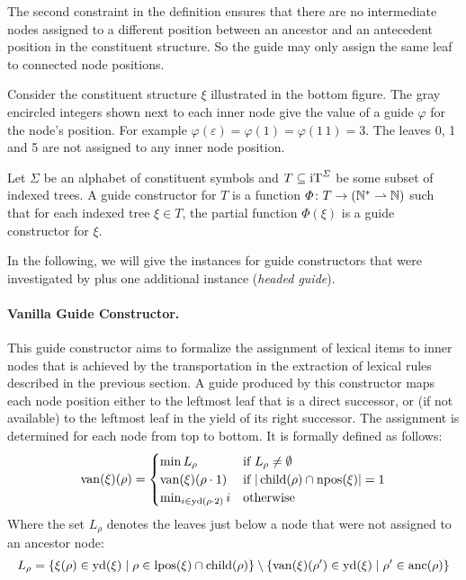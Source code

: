 \documentclass[../../document.tex]{subfiles}
\begin{document}
    The second constraint in the definition ensures that there are no intermediate nodes assigned to a different position between an ancestor and an antecedent position in the constituent structure.
    So the guide may only assign the same leaf to connected node positions.

    \begin{example}
        Consider the constituent structure \(\xi\) illustrated in the bottom figure.
        The gray encircled integers shown next to each inner node give the value of a guide \(\varphi\) for the node's position.
        For example \(\varphi(\varepsilon) = \varphi(1) = \varphi(1\,1) = 3\).
        The leaves 0, 1 and 5 are not assigned to any inner node position.

        \begin{center}
            
        \end{center}
    \end{example}

    \begin{definition}
        Let \(\varSigma\) be an alphabet of constituent symbols and \(T \subseteq \operatorname{iT}^\varSigma\) be some subset of indexed trees.
        A guide constructor for \(T\) is a function \(\varPhi\colon T \to (\mathbb{N}^* \rightharpoonup \mathbb{N})\) such that for each indexed tree \(\xi \in T\), the partial function \(\varPhi(\xi)\) is a guide constructor for \(\xi\).
    \end{definition}

    In the following, we will give the instances for guide constructors that were investigated by \citet{Rup22} plus one additional instance (\emph{headed guide}).

    \paragraph{Vanilla Guide Constructor.}
    This guide constructor aims to formalize the assignment of lexical items to inner nodes that is achieved by the transportation in the extraction of lexical  rules described in the previous section.
    A guide produced by this constructor maps each node position either to the leftmost leaf that is a direct successor, or (if not available) to the leftmost leaf in the yield of its right successor.
    The assignment is determined for each node from top to bottom.
    It is formally defined as follows:
    \[
    \mathrm{van}(\xi)(\rho) = \begin{cases}
        \min L_\rho & \text{if $L_\rho \neq \emptyset$} \\
        \mathrm{van}(\xi)(\rho \cdot 1) & \text{if $|\operatorname{child}(\rho) \cap \operatorname{npos}(\xi)| = 1$} \\
        \min_{i \in \operatorname{yd}(\rho\cdot 2)} i &\text{otherwise}
    \end{cases}
    \]
    Where the set \(L_\rho\) denotes the leaves just below a node that were not assigned to an ancestor node:
    \[
    L_\rho = \{\xi(\rho) \in \operatorname{yd}(\xi) \mid \rho \in \operatorname{lpos}(\xi) \cap \operatorname{child}(\rho) \} \setminus \{\mathrm{van}(\xi)(\rho') \in \operatorname{yd}(\xi) \mid \rho' \in \operatorname{anc}(\rho)\}
    \]
\end{document}
